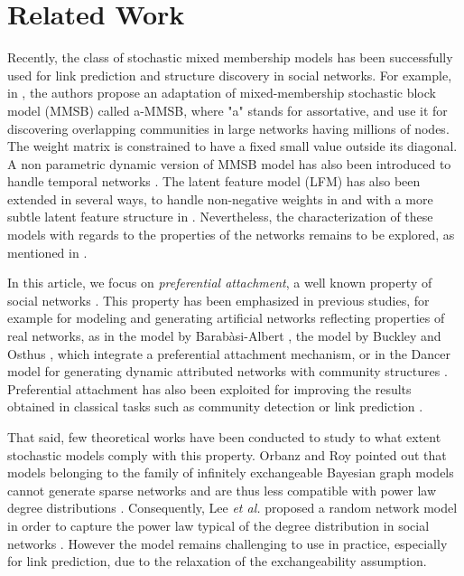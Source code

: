\documentclass[12pt]{article}
\begin{document}

{} %



%



\section{Related Work}
\label{sec:rel-work}

Recently,  the class of stochastic mixed membership models has been successfully used for link prediction and structure discovery in social networks. For example, in \cite{AMMSB}, the authors  propose an adaptation of mixed-membership stochastic block model (MMSB) called a-MMSB, where "a" stands for assortative, and use it for discovering overlapping communities in large networks having millions of nodes. The weight matrix is constrained to have a fixed small value outside its diagonal. A non parametric dynamic version of MMSB model has also been introduced to  handle temporal networks \cite{fan2015dynamic}. The latent feature model (LFM) has also been extended in several ways, to handle non-negative weights in \cite{IMRM} and with a more subtle latent feature structure in \cite{ILAM}. Nevertheless, the characterization of these models with regards to the properties of the networks remains to be explored, as mentioned in \cite{jacobs2014unified}.

In this article, we focus on \textit{preferential attachment}, a well known property of social networks \cite{Newman2010, Barabasi2003}. This property has been emphasized in previous studies, for example for modeling and generating artificial networks reflecting properties of real networks, as in the model by Barab\`asi-Albert \cite{albert2002statistical}, the model by Buckley and Osthus \cite{Buckley2001}, which integrate a preferential attachment mechanism, or in the Dancer model for generating dynamic attributed networks with community structures \cite{Largeron2017}. Preferential attachment has also  been exploited for improving the results obtained in classical tasks such as community detection \cite{Ciglan2013} or link prediction \cite{Zeng2016}.

That said, few theoretical works have been conducted to study to what extent stochastic models comply with this property. 
Orbanz and Roy  pointed out that models belonging to the family of infinitely exchangeable Bayesian graph models cannot generate sparse networks and are thus less compatible with power law degree distributions \cite{orbanz2015bayesian}. Consequently, Lee \textit{et al.}  proposed a random network model in order to capture the power law typical of the degree distribution in social networks \cite{Lee2015}. However the model remains challenging to use in practice, especially for link prediction, due to the relaxation of the exchangeability assumption.~\\
\end{document}
